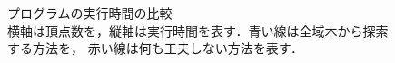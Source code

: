 \documentclass[11pt]{jarticle}
\begin{document}
\begin{figure}[H]
  \centering

  \hfill
  \hfill

  \caption{プログラムの実行時間の比較 \\
    横軸は頂点数を，縦軸は実行時間を表す．青い線は全域木から探索する方法を，
    赤い線は何も工夫しない方法を表す．
  }
  \label{fig:time}
\end{figure}



\end{document}
